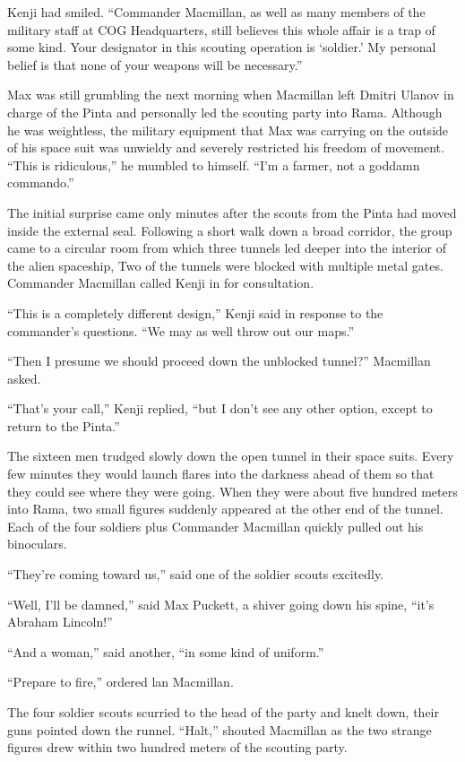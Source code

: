 \documentclass[]{article}
\begin{document}
{Kenji had smiled.  “Commander Macmillan, as well as many members of the military staff at COG Headquarters, still believes this whole affair is a trap of some kind.  Your designator in this scouting operation is ‘soldier.’ My personal belief is that none of your weapons will be necessary.”

Max was still grumbling the next morning when Macmillan left Dmitri Ulanov in charge of the Pinta and personally led the scouting party into Rama.  Although he was weightless, the military equipment that Max was carrying on the outside of his space suit was unwieldy and severely restricted his freedom of movement.  “This is ridiculous,” he mumbled to himself.  “I’m a farmer, not a goddamn commando.”

The initial surprise came only minutes after the scouts from the Pinta had moved inside the external seal.  Following a short walk down a broad corridor, the group came to a circular room from which three tunnels led deeper into the interior of the alien spaceship, Two of the tunnels were blocked with multiple metal gates.  Commander Macmillan called Kenji in for consultation.

“This is a completely different design,” Kenji said in response to the commander’s questions.  “We may as well throw out our maps.”

“Then I presume we should proceed down the unblocked tunnel?” Macmillan asked.

“That’s your call,” Kenji replied, “but I don’t see any other option, except to return to the Pinta.”

The sixteen men trudged slowly down the open tunnel in their space suits.  Every few minutes they would launch flares into the darkness ahead of them so that they could see where they were going.  When they were about five hundred meters into Rama, two small figures suddenly appeared at the other end of the tunnel.  Each of the four soldiers plus Commander Macmillan quickly pulled out his binoculars.

“They’re coming toward us,” said one of the soldier scouts excitedly.

“Well, I’ll be damned,” said Max Puckett, a shiver going down his spine, “it’s Abraham Lincoln!”

“And a woman,” said another, “in some kind of uniform.”

“Prepare to fire,” ordered lan Macmillan.

The four soldier scouts scurried to the head of the party and knelt down, their guns pointed down the runnel.  “Halt,” shouted Macmillan as the two strange figures drew within two hundred meters of the scouting party.

}
\end{document}
